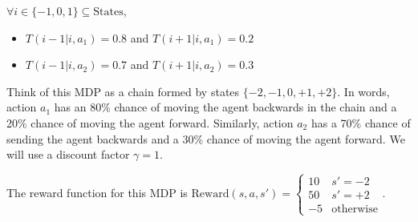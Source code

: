 \documentclass{article}
\theoremstyle{case}
\theoremstyle{definition}
\begin{document}
$\forall i \in \{-1, 0, 1\} \subseteq \text{States}$,
\begin{itemize}
    \item  $T(i-1 | i, a_1) = 0.8$ and $T(i+1 | i, a_1) = 0.2$
    \item  $T(i-1 | i, a_2) = 0.7$ and $T(i+1 | i, a_2) = 0.3$
\end{itemize}

Think of this MDP as a chain formed by states $\{-2,-1,0,+1,+2\}$. In words, action $a_1$ has an 80\% chance of moving the agent backwards in the chain and a 20\% chance of moving the agent forward. Similarly, action $a_2$ has a 70\% chance of sending the agent backwards and a 30\% chance of moving the agent forward. We will use a discount factor $\gamma=1$. \newline

The reward function for this MDP is $\text{Reward}(s,a,s') = \begin{cases} 10 & s' = -2 \\ 50 & s' = +2 \\ -5 & \text{otherwise} \end{cases}$.
\end{document}
